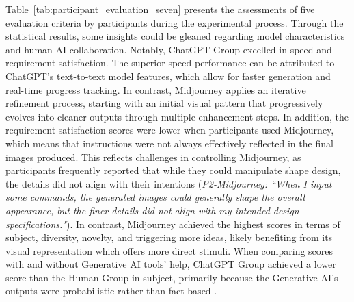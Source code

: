 \documentclass{dsj}
\begin{document}
Table~\ref{tab:participant_evaluation_seven} presents the assessments of five evaluation criteria by participants during the experimental process. Through the statistical results, some insights could be gleaned regarding model characteristics and human-AI collaboration. Notably, ChatGPT Group excelled in speed and requirement satisfaction. The superior speed performance can be attributed to ChatGPT's text-to-text model features, which allow for faster generation and real-time progress tracking. In contrast, Midjourney applies an iterative refinement process, starting with an initial visual pattern that progressively evolves into cleaner outputs through multiple enhancement steps. In addition, the requirement satisfaction scores were lower when participants used Midjourney, which means that instructions were not always effectively reflected in the final images produced. This reflects challenges in controlling Midjourney, as participants frequently reported that while they could manipulate shape design, the details did not align with their intentions (\textit{P2-Midjourney: ``When I input some commands, the generated images could generally shape the overall appearance, but the finer details did not align with my intended design specifications."}). In contrast, Midjourney achieved the highest scores in terms of subject, diversity, novelty, and triggering more ideas, likely benefiting from its visual representation which offers more direct stimuli. When comparing scores with and without Generative AI tools’ help, ChatGPT Group achieved a lower score than the Human Group in subject, primarily because the Generative AI's outputs were probabilistic rather than fact-based \citep{brown2020language}. 
\end{document}
